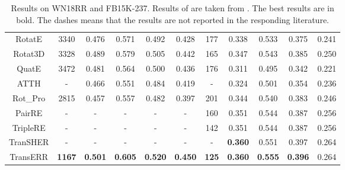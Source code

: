 \documentclass[11pt]{article}
\begin{document}
\begin{table*}[!htb]
{\begin{tabular}{ccccccccccc}
			RotatE    & 3340                                & 0.476                                  & 0.571          & 0.492          & 0.428          & 177          & 0.338          & 0.533          & 0.375          & 0.241          \\
			Rotat3D    & 3328                                & 0.489                                  & 0.579          & 0.505          & 0.442          & 165          & 0.347          & 0.543          & 0.385          & 0.250          \\
			QuatE              & 3472                                & 0.481                                  & 0.564          & 0.500          & 0.436          & 176          & 0.311          & 0.495          & 0.342          & 0.221          \\
			ATTH               & -                                   & 0.466                                  & 0.551          & 0.484          & 0.419          & -            & 0.324          & 0.501          & 0.354          & 0.236          \\
			Rot\_Pro           & 2815                                & 0.457                                  & 0.557          & 0.482          & 0.397          & 201          & 0.344          & 0.540          & 0.383          & 0.246          \\
			PairRE             &     -                               & -                                      & -              & -              & -              & 160          & 0.351          & 0.544          & 0.387          & 0.256          \\ 
			TripleRE   & -                                     & -                                   & -              & -              & -              & 142   & 0.351          & 0.544          & 0.387          & 0.256          \\
			TranSHER   & -                                     & -                                   & -              & -              & -              & -   & \textbf{0.360}          & 0.551          & 0.397          & 0.264          \\  \hline
			
			
			TransERR            & \textbf{1167}                       & \textbf{0.501}                         & \textbf{0.605} & \textbf{0.520} & \textbf{0.450} & \textbf{125} & \textbf{0.360} & \textbf{0.555} & \textbf{0.396} & 0.264          \\ \hline
		\end{tabular}}
	\caption{Results on WN18RR and FB15K-237. Results of  are taken from  \citet{31sun2019rotate}. The best results are in bold. The dashes means that the results are not reported in the responding literature.}

	\label{tab:wn18rr+fb237}
\end{table*}
\end{document}
